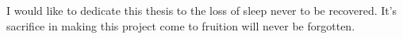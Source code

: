 
\begin{dedication}

    I would like to dedicate this thesis to the loss of sleep never to be recovered. It's sacrifice in making this project come to fruition will never be forgotten.

\end{dedication}

